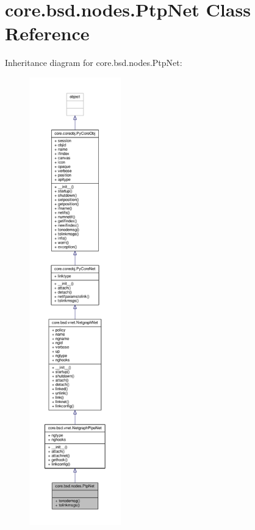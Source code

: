 \hypertarget{classcore_1_1bsd_1_1nodes_1_1_ptp_net}{\section{core.\+bsd.\+nodes.\+Ptp\+Net Class Reference}
\label{classcore_1_1bsd_1_1nodes_1_1_ptp_net}
}


Inheritance diagram for core.\+bsd.\+nodes.\+Ptp\+Net\+:
\nopagebreak
\begin{figure}[H]
\begin{center}
\leavevmode
\includegraphics[height=550pt]{classcore_1_1bsd_1_1nodes_1_1_ptp_net__inherit__graph}
\end{center}
\end{figure}


